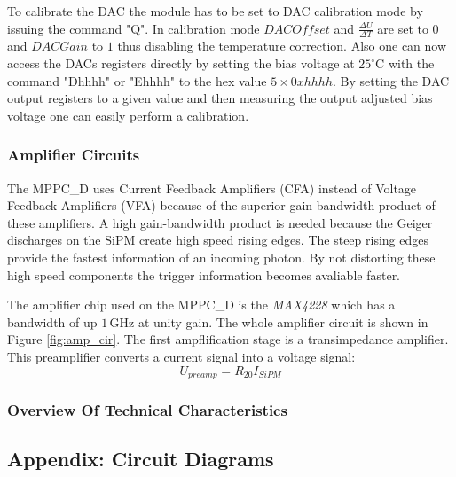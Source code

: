\documentclass[]{article}
\begin{document}
To calibrate the DAC the module has to be set to DAC calibration mode by issuing the command "Q". In calibration mode $DACOffset$ and $\frac{\Delta U}{\Delta T}$ 
are set to $0$ and $DACGain$ to $1$ thus disabling the temperature correction. Also one can now access the DACs registers directly by setting the bias voltage 
at $25^{\circ} \text{C}$ with the command "Dhhhh" or "Ehhhh" to the hex value $5\times0xhhhh$. By setting the DAC output registers to a given value and then measuring the 
output adjusted bias voltage one can easily perform a calibration.

\subsubsection{Amplifier Circuits}

The MPPC\_D uses Current Feedback Amplifiers (CFA) instead of Voltage Feedback Amplifiers (VFA) because of the superior gain-bandwidth product of these amplifiers. A high 
gain-bandwidth product is needed because the Geiger discharges on the SiPM create high speed rising edges. The steep rising edges provide the fastest information of an incoming photon. 
By not distorting these high speed components the trigger information becomes avaliable faster.

The amplifier chip used on the MPPC\_D is the \emph{MAX4228} which has a bandwidth of up $1\,\text{GHz}$ at unity gain. The whole amplifier circuit is shown in Figure \ref{fig:amp_cir}. The first
ampflification stage is a transimpedance amplifier. This preamplifier converts a current signal into a voltage signal:
\begin{equation}
	U_{preamp} = R_{20} I_{SiPM}
\end{equation}

\subsubsection{Overview Of Technical Characteristics}

\subsection{Appendix: Circuit Diagrams}
\end{document}
